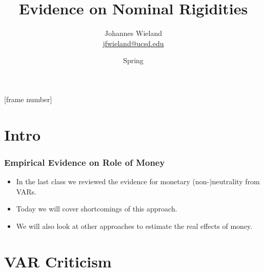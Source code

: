 \documentclass[english,xcolor=svgnames]{beamer}
\begin{document}
\title{Evidence on Nominal Rigidities}
\vspace{1cm}
\author[shortname]{
\begin{tabular}{c}
	Johannes Wieland \\ 
	\footnotesize \href{mailto:jfwieland@ucsd.edu}{jfwieland@ucsd.edu}  \\ 
\end{tabular}
}

\date{Spring \the\year}

\makebeamertitle
{}[frame number]{}

\addtocounter{framenumber}{-1}



\section{Intro}

\begin{frame}
\frametitle{Empirical Evidence on Role of Money}
\begin{itemize}
	\item In the last class we reviewed the evidence for monetary (non-)neutrality from VARs.
	\item Today we will cover shortcomings of this approach.
	\item We will also look at other approaches to estimate the real effects of money.
\end{itemize}
\end{frame}


\section{VAR Criticism}
\end{document}
